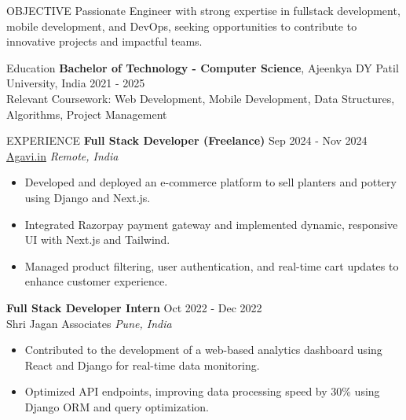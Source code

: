 \documentclass{style} %
\begin{document}

\begin{rSection}{OBJECTIVE}
{Passionate Engineer with strong expertise in fullstack development, mobile development, and DevOps, seeking opportunities to contribute to innovative projects and impactful teams.}
\end{rSection}


\begin{rSection}{Education}
{\bf Bachelor of Technology - Computer Science}, Ajeenkya DY Patil University, India \hfill {2021 - 2025}\\
Relevant Coursework: Web Development, Mobile Development, Data Structures, Algorithms, Project Management
\end{rSection}


\begin{rSection}{EXPERIENCE}
\textbf{Full Stack Developer (Freelance)} \hfill Sep 2024 - Nov 2024\\
\href{https://agavi.in}{Agavi.in} \hfill \textit{Remote, India}
 \begin{itemize}
    \itemsep -3pt {} 
     \item Developed and deployed an e-commerce platform to sell planters and pottery using Django and Next.js.
     \item Integrated Razorpay payment gateway and implemented dynamic, responsive UI with Next.js and Tailwind.
     \item Managed product filtering, user authentication, and real-time cart updates to enhance customer experience.
 \end{itemize}
 
\textbf{Full Stack Developer Intern} \hfill Oct 2022 - Dec 2022\\
Shri Jagan Associates \hfill \textit{Pune, India}
 \begin{itemize}
    \itemsep -3pt {} 
     \item Contributed to the development of a web-based analytics dashboard using React and Django for real-time data monitoring.
     \item Optimized API endpoints, improving data processing speed by 30\% using Django ORM and query optimization.
 \end{itemize}
\end{rSection} 
\end{document}
